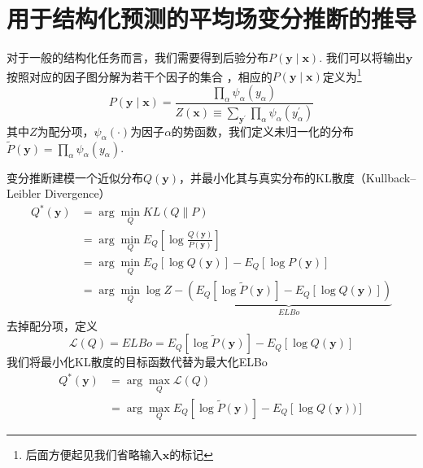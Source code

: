 \chapter{用于结构化预测的平均场变分推断的推导}
\label{appendix:mfvi-derivation}
对于一般的结构化任务而言，我们需要得到后验分布$P(\boldsymbol{y}\mid\boldsymbol{x})$.
我们可以将输出$\boldsymbol{y}$按照对应的因子图分解为若干个因子的集合 \citep{sutton-etal-2012-crf}，相应的$P(\boldsymbol{y}\mid\boldsymbol{x})$定义为\footnote{后面方便起见我们省略输入$\boldsymbol{x}$的标记}
\begin{equation}\label{eq:posterior}
	P(\boldsymbol{y}\mid\boldsymbol{x}) =\frac{\prod_{\alpha} \psi_{\alpha}(y_{\alpha})}{Z(\boldsymbol{x})\equiv\sum_{\boldsymbol{y}^{\prime}}\prod_{\alpha} \psi_{\alpha}(y^{\prime}_{\alpha})}
\end{equation}
其中$Z$为配分项，$\psi_{\alpha}(\cdot)$为因子$\alpha$的势函数，我们定义未归一化的分布$\tilde{P}(\boldsymbol{y})=\prod_{\alpha} \psi_{\alpha}(y_{\alpha})$.

变分推断建模一个近似分布$Q(\boldsymbol{y})$，并最小化其与真实分布的KL散度（Kullback–Leibler Divergence）
\begin{equation}
	\begin{split}
		Q^{\ast}(\boldsymbol{y})
		&=\arg\min_{Q} KL(Q\parallel P)\\
		&=\arg\min_{Q} E_{Q}\left[\log\frac{Q(\boldsymbol{y})}{P(\boldsymbol{y})}\right]\\
		&=\arg\min_{Q} E_{Q}\left[\log Q(\boldsymbol{y})\right] - E_{Q}\left[\log P(\boldsymbol{y})\right]\\
		&=\arg\min_{Q} \log Z-\underbrace{\left(E_{Q}\left[\log \tilde{P}(\boldsymbol{y})\right]-E_{Q}\left[\log Q(\boldsymbol{y})\right]\right)}_{ELBo}
	\end{split}
\end{equation}
去掉配分项，定义
\begin{equation}
	\mathcal{L}(Q)=ELBo=E_{Q}\left[\log \tilde{P}(\boldsymbol{y})\right]-E_{Q}\left[\log Q(\boldsymbol{y})\right]
\end{equation}
我们将最小化KL散度的目标函数代替为最大化ELBo
\begin{equation}
	\begin{split}
		Q^{\ast}(\boldsymbol{y}) &= \arg\max_{Q}\mathcal{L}(Q)\\
		&= \arg\max_{Q}E_{Q}\left[\log \tilde{P}(\boldsymbol{y})\right]-E_{Q}\left[\log Q(\boldsymbol{y}))\right]
	\end{split}
\end{equation}


